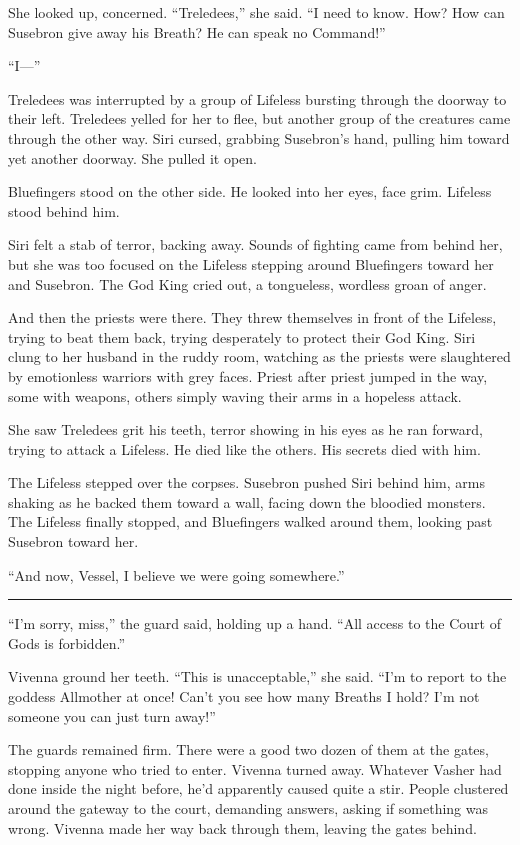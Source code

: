 She looked up, concerned. “Treledees,” she said. “I need to know. How? How can Susebron give away his Breath? He can speak no Command!”

“I—”

Treledees was interrupted by a group of Lifeless bursting through the doorway to their left. Treledees yelled for her to flee, but another group of the creatures came through the other way. Siri cursed, grabbing Susebron’s hand, pulling him toward yet another doorway. She pulled it open.

Bluefingers stood on the other side. He looked into her eyes, face grim. Lifeless stood behind him.

Siri felt a stab of terror, backing away. Sounds of fighting came from behind her, but she was too focused on the Lifeless stepping around Bluefingers toward her and Susebron. The God King cried out, a tongueless, wordless groan of anger.

And then the priests were there. They threw themselves in front of the Lifeless, trying to beat them back, trying desperately to protect their God King. Siri clung to her husband in the ruddy room, watching as the priests were slaughtered by emotionless warriors with grey faces. Priest after priest jumped in the way, some with weapons, others simply waving their arms in a hopeless attack.

She saw Treledees grit his teeth, terror showing in his eyes as he ran forward, trying to attack a Lifeless. He died like the others. His secrets died with him.

The Lifeless stepped over the corpses. Susebron pushed Siri behind him, arms shaking as he backed them toward a wall, facing down the bloodied monsters. The Lifeless finally stopped, and Bluefingers walked around them, looking past Susebron toward her.

“And now, Vessel, I believe we were going somewhere.”

\bigskip \hrule \bigskip

“I’m sorry, miss,” the guard said, holding up a hand. “All access to the Court of Gods is forbidden.”

Vivenna ground her teeth. “This is unacceptable,” she said. “I’m to report to the goddess Allmother at once! Can’t you see how many Breaths I hold? I’m not someone you can just turn away!”

The guards remained firm. There were a good two dozen of them at the gates, stopping anyone who tried to enter. Vivenna turned away. Whatever Vasher had done inside the night before, he’d apparently caused quite a stir. People clustered around the gateway to the court, demanding answers, asking if something was wrong. Vivenna made her way back through them, leaving the gates behind.

